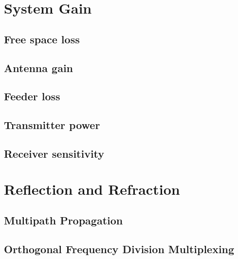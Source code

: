 \section{System Gain}

\subsection{Free space loss}

\subsection{Antenna gain}

\subsection{Feeder loss}

\subsection{Transmitter power}

\subsection{Receiver sensitivity}


\section{Reflection and Refraction}

\subsection{Multipath Propagation}

\subsection{Orthogonal Frequency Division Multiplexing}
